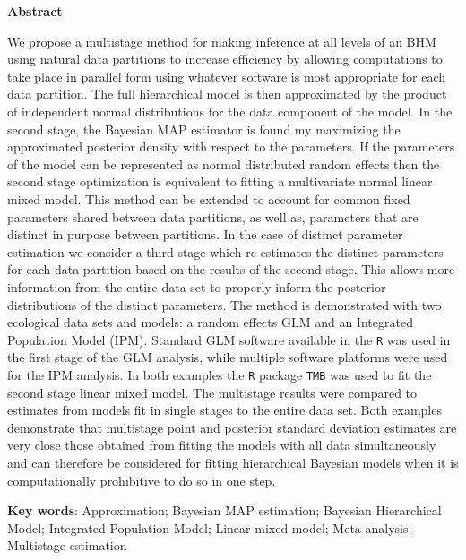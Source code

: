 \documentclass[12pt]{article}
\begin{document}
\vspace*{\fill}
\begin{center}
\begin{minipage}{0.65\paperwidth}
\renewcommand{\baselinestretch}{1}\normalsize

\centerline{\bf Abstract} 
We propose a multistage method for making inference at all levels of an BHM using natural data partitions to increase efficiency by allowing computations to take place in parallel form using whatever software is most appropriate for each data partition. The full hierarchical model is then approximated by the product of independent normal distributions for the data component of the model. In the second stage, the Bayesian MAP estimator is found my maximizing the approximated posterior density with respect to the parameters. If the parameters of the model can be represented as normal distributed random effects then the second stage optimization is equivalent to fitting a multivariate normal linear mixed model. This method can be extended to account for common fixed parameters shared between data partitions, as well as, parameters that are distinct in purpose between partitions. In the case of distinct parameter estimation we consider a third stage which re-estimates the distinct parameters for each data partition based on the results of the second stage. This allows more information from the entire data set to properly inform the posterior distributions of the distinct parameters. The method is demonstrated with two ecological data sets and models: a random effects GLM and an Integrated Population Model (IPM). Standard GLM software available in the {\tt R} was used in the first stage of the GLM analysis, while multiple software platforms were used for the IPM analysis. In both examples the {\tt R} package {\tt TMB} was used to fit the second stage linear mixed model. The multistage results were compared to estimates from models fit in single stages to the entire data set. Both examples demonstrate that multistage point and posterior standard deviation estimates are very close those obtained from fitting the models with all data simultaneously and can therefore be considered for fitting hierarchical Bayesian models when it is computationally prohibitive to do so in one step.     

\bigskip

{\bf Key words}: Approximation; Bayesian MAP estimation; Bayesian Hierarchical Model; Integrated Population Model; Linear mixed model; Meta-analysis; Multistage estimation
\end{minipage}
\end{center}
\end{document}
